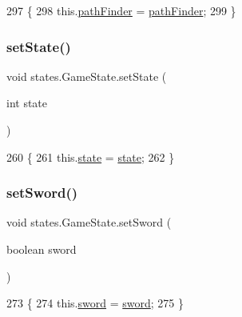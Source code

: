 \begin{DoxyCode}
297                                                      \{
298         this.\mbox{\hyperlink{classstates_1_1_game_state_aeaae3c340636293db4737187e847f764}{pathFinder}} = \mbox{\hyperlink{classstates_1_1_game_state_aeaae3c340636293db4737187e847f764}{pathFinder}};
299     \}
\end{DoxyCode}
\mbox{\label{classstates_1_1_game_state_a641263329dfd0fd93b595ccddfc393fa}} 
\subsubsection{\texorpdfstring{set\+State()}{setState()}}
{\footnotesize\ttfamily void states.\+Game\+State.\+set\+State (\begin{DoxyParamCaption}\item[{int}]{state }\end{DoxyParamCaption})\hspace{0.3cm}{\ttfamily [inline]}}


\begin{DoxyCode}
260                                     \{
261         this.\mbox{\hyperlink{classstates_1_1_game_state_a5e07b1776e13d009e1a8c6a1e8140d04}{state}} = \mbox{\hyperlink{classstates_1_1_game_state_a5e07b1776e13d009e1a8c6a1e8140d04}{state}};
262     \}
\end{DoxyCode}
\mbox{\label{classstates_1_1_game_state_a4b4deae89360aac49314b7b0a1c87f6c}} 
\subsubsection{\texorpdfstring{set\+Sword()}{setSword()}}
{\footnotesize\ttfamily void states.\+Game\+State.\+set\+Sword (\begin{DoxyParamCaption}\item[{boolean}]{sword }\end{DoxyParamCaption})\hspace{0.3cm}{\ttfamily [inline]}}


\begin{DoxyCode}
273                                         \{
274         this.\mbox{\hyperlink{classstates_1_1_game_state_af984dc048942d10169fb7127bcc30273}{sword}} = \mbox{\hyperlink{classstates_1_1_game_state_af984dc048942d10169fb7127bcc30273}{sword}};
275     \}
\end{DoxyCode}
\mbox{\label{classstates_1_1_game_state_a5b3d7d529435681f3276acf887f137a7}} 
